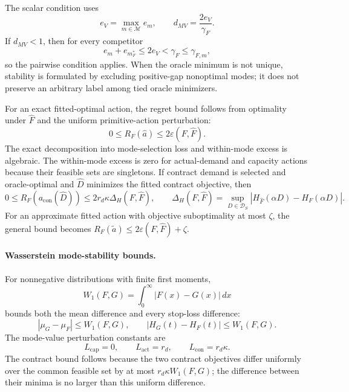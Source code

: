 \documentclass[]{interact}
\begin{document}
The scalar condition uses
\[
e_V=\max_{m\in\mathcal M}e_m,
\qquad
d_{MV}=\frac{2e_V}{\gamma_F}.
\]
If $d_{MV}<1$, then for every competitor
\[
e_m+e_{m_F^\ast}
\leq2e_V<\gamma_F\leq\gamma_{F,m},
\]
so the pairwise condition applies. When the oracle minimum is not
unique, stability is formulated by excluding positive-gap nonoptimal
modes; it does not preserve an arbitrary label among tied oracle
minimizers.

For an exact fitted-optimal action, the regret bound follows from
optimality under $\widehat F$ and the uniform primitive-action
perturbation:
\[
0\leq R_F(\widehat a)\leq2\varepsilon(F,\widehat F).
\]
The exact decomposition into mode-selection loss and within-mode
excess is algebraic. The within-mode excess is zero for actual-demand
and capacity actions because their feasible sets are singletons. If
contract demand is selected and oracle-optimal and $\widehat D$
minimizes the fitted contract objective, then
\[
0\leq R_F(a_{\mathrm{con}}(\widehat D))
\leq2r_d\kappa\Delta_H(F,\widehat F),
\qquad
\Delta_H(F,\widehat F)
=
\sup_{D\in\mathcal D_S}
|H_{\widehat F}(\alpha D)-H_F(\alpha D)|.
\]
For an approximate fitted action with objective suboptimality at most
$\zeta$, the general bound becomes
$R_F(\widetilde a)\leq2\varepsilon(F,\widehat F)+\zeta$.

\paragraph*{Wasserstein mode-stability bounds.}
For nonnegative distributions with finite first moments,
\[
W_1(F,G)=\int_0^\infty|F(x)-G(x)|\,dx
\]
bounds both the mean difference and every stop-loss difference:
\[
|\mu_G-\mu_F|\leq W_1(F,G),
\qquad
|H_G(t)-H_F(t)|\leq W_1(F,G).
\]
The mode-value perturbation constants are
\[
L_{\mathrm{cap}}=0,\qquad
L_{\mathrm{act}}=r_d,\qquad
L_{\mathrm{con}}=r_d\kappa.
\]
The contract bound follows because the two contract objectives differ
uniformly over the common feasible set by at most
$r_d\kappa W_1(F,G)$; the difference between their minima is no larger
than this uniform difference.
\end{document}
